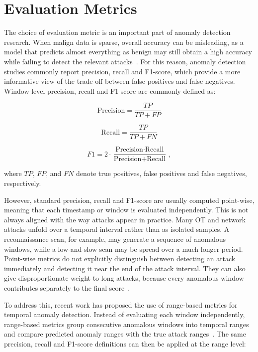 \section{Evaluation Metrics}
\label{sec:evaluation_metrics}
The choice of evaluation metric is an important part of anomaly detection research. When malign data is sparse, overall accuracy can be misleading, as a model  that predicts almost everything as benign may still obtain a high accuracy while failing to detect the relevant attacks~\cite{wang_guardians_2026, fung_perspectives_2022}. For this reason, anomaly detection studies commonly report precision, recall and F1-score, which provide a more informative view of the trade-off between false positives and false negatives. Window-level precision, recall and F1-score are commonly defined as:

\begin{equation}
\text{Precision} = \frac{TP}{TP + FP}
\label{eq:precision}
\end{equation}

\begin{equation}
\text{Recall} = \frac{TP}{TP + FN}
\label{eq:recall}
\end{equation}

\begin{equation}
F1 = 2 \cdot \frac{\text{Precision} \cdot \text{Recall}}{\text{Precision} + \text{Recall}}\, ,
\label{eq:f1}
\end{equation}

\noindent where $TP$, $FP$, and $FN$ denote true positives, false positives and false negatives, respectively.


However, standard precision, recall and F1-score are usually computed point-wise, meaning that each timestamp or window is evaluated independently. This is not always aligned with the way attacks appear in practice. Many OT and network attacks unfold over a temporal interval rather than as isolated samples. A reconnaissance scan, for example, may generate a sequence of anomalous windows, while a low-and-slow scan may be spread over a much longer period. Point-wise metrics do not explicitly distinguish between detecting an attack immediately and detecting it near the end of the attack interval. They can also give disproportionate weight to long attacks, because every anomalous window contributes separately to the final score~\cite{fung_perspectives_2022}.


To address this, recent work has proposed the use of range-based metrics for temporal anomaly detection. Instead of evaluating each window independently, range-based metrics group consecutive anomalous windows into temporal ranges and compare predicted anomaly ranges with the true attack ranges~\cite{fung_perspectives_2022}. The same precision, recall and F1-score definitions can then be applied at the
range level:


